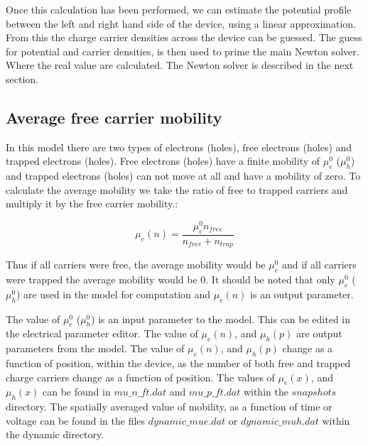 Once this calculation has been performed, we can estimate the potential profile between the left and right hand side of the device, using a linear approximation. From this the charge carrier densities across the device can be guessed.  The guess for potential and carrier densities, is then used to prime the main Newton solver.  Where the real value are calculated.  The Newton solver is described in the next section.



\subsection{Average free carrier mobility}
In this model there are two types of electrons (holes), free electrons (holes) and trapped electrons (holes).  Free electrons (holes) have a finite mobility of $\mu_e^0$ ($\mu_h^0$) and trapped electrons (holes) can not move at all and have a mobility of zero.  To calculate the average mobility we take the ratio of free to trapped carriers and multiply it by the free carrier mobility.:

\begin{equation}
\mu_e(n)=\frac{\mu_e^0 n_{free}}{n_{free}+n_{trap}}
\end{equation}

Thus if all carriers were free, the average mobility would be $\mu_e^0$ and if all carriers were trapped the average mobility would be 0.  It should be noted that only $\mu_e^0$ ($\mu_h^0$) are used in the model for computation and $\mu_e(n)$ is an output parameter.

The value of $\mu_e^0$ ($\mu_h^0$) is an input parameter to the model.  This can be edited in the electrical parameter editor.  The value of $\mu_e(n)$, and $\mu_h(p)$ are output parameters from the model.  The value of $\mu_e(n)$, and $\mu_h(p)$ change as a function of position, within the device, as the number of both free and trapped charge carriers change as a function of position.  The values of  $\mu_e(x)$, and $\mu_h(x)$ can be found in $mu\_n\_ft.dat$ and $mu\_p\_ft.dat$ within the $snapshots$ directory.  The spatially averaged value of mobility, as a function of time or voltage can be found in the files $dynamic\_mue.dat$ or $dynamic\_muh.dat$ within the dynamic directory.

